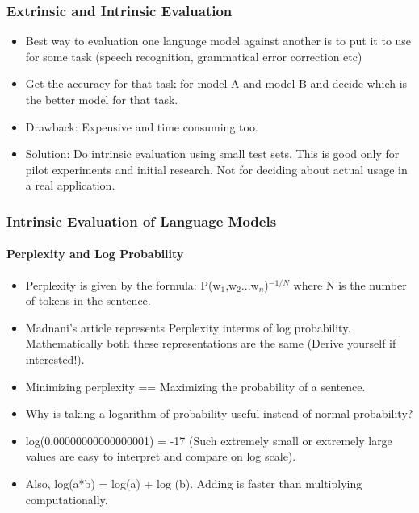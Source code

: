 \documentclass{beamer}
\begin{document}
\begin{frame}
\frametitle{Extrinsic and Intrinsic Evaluation}
\begin{itemize}
\item Best way to evaluation one language model against another is to put it to use for some task (speech recognition, grammatical error correction etc)
\item Get the accuracy for that task for model A and model B and decide which is the better model for that task.
\item Drawback: Expensive and time consuming too. 
\item Solution: Do intrinsic evaluation using small test sets. This is good only for pilot experiments and initial research. Not for deciding about actual usage in a real application. 
\end{itemize}
\end{frame}

\begin{frame}
\frametitle{Intrinsic Evaluation of Language Models}
\framesubtitle{Perplexity and Log Probability}
\begin{itemize}
\item Perplexity is given by the formula: P(w$_1$,w$_2$...w$_n$)$^{-1/N}$ where N is the number of tokens in the sentence.
\item Madnani's article represents Perplexity interms of log probability. Mathematically both these representations are the same (Derive yourself if interested!).
\item Minimizing perplexity == Maximizing the probability of a sentence. \pause
\item Why is taking a logarithm of probability useful instead of normal probability? \pause
\item log(0.00000000000000001) = -17 (Such extremely small or extremely large values are easy to interpret and compare on log scale).
\item Also, log(a*b) = log(a) + log (b). Adding is faster than multiplying computationally.
\end{itemize}
\end{frame}
\end{document}

